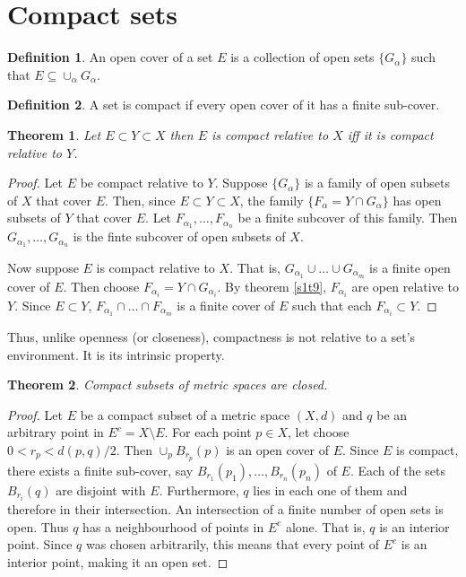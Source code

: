 \documentclass{article}
\theoremstyle{plain}
\newtheorem{thm}{Theorem}
\numberwithin{thm}{section}
\theoremstyle{plain}
\numberwithin{prop}{section}
\theoremstyle{definition}
\newtheorem{defn}{Definition}
\numberwithin{defn}{section}
\theoremstyle{remark}
\numberwithin{equation}{section}
\begin{document}
\section{Compact sets}\label{s2}
\begin{defn}\label{s2d1}
An open cover of a set $E$ is a collection of open sets $\{G_\alpha\}$ such that
$E \subseteq \cup_\alpha G_\alpha$.
\end{defn}

\begin{defn}\label{s2d2}
A set is compact if every open cover of it has a finite sub-cover.
\end{defn}

\begin{thm}\label{s2t1}
Let $E \subset Y \subset X$ then $E$ is compact relative to $X$ iff it is 
compact relative to $Y$.
\end{thm}
\begin{proof}
Let $E$ be compact relative to $Y$. Suppose $\{G_\alpha\}$ is a family of
open subsets of $X$ that cover $E$. Then, since $E \subset Y \subset X$, the
family $\{F_\alpha = Y \cap G_\alpha\}$ has open subsets of $Y$ that cover $E$.
Let $F_{\alpha_1}, \ldots, F_{\alpha_n}$ be a finite subcover of this family.
Then $G_{\alpha_1}, \ldots, G_{\alpha_n}$ is the finte subcover of open subsets
of $X$.

Now suppose $E$ is compact relative to $X$. That is, $G_{\alpha_1} \cup \ldots
\cup G_{\alpha_m}$ is a finite open cover of $E$. Then choose $F_{\alpha_i} = 
Y \cap G_{\alpha_i}$. By theorem \ref{s1t9}, $F_{\alpha_i}$ are open relative 
to $Y$. Since $E \subset Y$, $F_{\alpha_1} \cap \ldots \cap
F_{\alpha_m}$ is a finite cover of $E$ such that each $F_{\alpha_i} \subset Y$.
\end{proof}

Thus, unlike openness (or closeness), compactness is not relative to a set's
environment. It is its intrinsic property.

\begin{thm}\label{s2t2}
Compact subsets of metric spaces are closed.
\end{thm}
\begin{proof}
Let $E$ be a compact subset of a metric space $(X, d)$ and $q$ be an arbitrary
point in $E^c = X \setminus E$. For each point $p \in X$, let choose $0 < r_p
< d(p, q)/2$. Then $\cup_p B_{r_p}(p)$ is an open cover of $E$. Since $E$ is
compact, there exists a finite sub-cover, say $B_{r_1}(p_1), \ldots, 
B_{r_n}(p_n)$ of $E$. Each of the sets $B_{r_i}(q)$ are disjoint with $E$. 
Furthermore, $q$ lies in each one of them and therefore in their intersection.
An intersection of a finite number of open sets is open. Thus $q$ has a 
neighbourhood of points in $E^c$ alone. That is, $q$ is an interior point. Since
$q$ was chosen arbitrarily, this means that every point of $E^c$ is an interior
point, making it an open set.
\end{proof}
\end{document}
